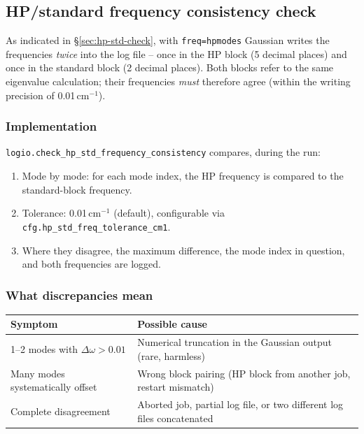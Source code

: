 \documentclass[11pt,a4paper,twoside]{article}
\theoremstyle{remark}
\begin{document}
\subsection{HP/standard frequency consistency check}
\label{sec:hp-std}

As indicated in \S\ref{sec:hp-std-check}, with
\texttt{freq=hpmodes} Gaussian writes the frequencies
\emph{twice} into the log file -- once in the HP block (5 decimal
places) and once in the standard block (2 decimal places). Both
blocks refer to the same eigenvalue calculation; their frequencies
\emph{must} therefore agree (within the writing precision of
0.01\,cm$^{-1}$).

\subsubsection*{Implementation}

\texttt{logio.check\_hp\_std\_frequency\_consistency} compares,
during the run:

\begin{enumerate}
  \item Mode by mode: for each mode index, the HP frequency is
        compared to the standard-block frequency.
  \item Tolerance: 0.01\,cm$^{-1}$ (default), configurable via
        \texttt{cfg.hp\_std\_freq\_tolerance\_cm1}.
  \item Where they disagree, the maximum difference, the mode
        index in question, and both frequencies are logged.
\end{enumerate}

\subsubsection*{What discrepancies mean}

\begin{center}
\begin{tabularx}{\textwidth}{l X}
\toprule
\textbf{Symptom} & \textbf{Possible cause} \\
\midrule
1--2 modes with $\Delta\omega > 0.01$ &
  Numerical truncation in the Gaussian output (rare, harmless) \\
Many modes systematically offset &
  Wrong block pairing (HP block from another job, restart
  mismatch) \\
Complete disagreement &
  Aborted job, partial log file, or two different log files
  concatenated \\
\bottomrule
\end{tabularx}
\end{center}
\end{document}

